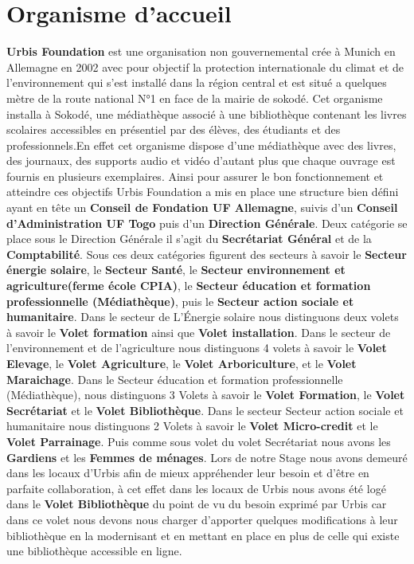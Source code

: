 \documentclass[12pt,a4paper]{article}
\begin{document}
\section{Organisme d'accueil}
\textbf{Urbis Foundation} est une organisation non gouvernemental crée à Munich en Allemagne en 2002 avec pour objectif la protection internationale du climat et de l’environnement qui s'est installé dans la région central et est situé a quelques mètre de la route national N°1 en face de la mairie de sokodé. Cet organisme installa à Sokodé, une médiathèque associé à une bibliothèque contenant les livres scolaires accessibles en présentiel par des élèves, des étudiants et des professionnels.En effet cet organisme dispose d'une médiathèque avec des livres, des journaux, des supports audio et vidéo d'autant plus que chaque ouvrage est fournis en plusieurs exemplaires. Ainsi pour assurer le bon fonctionnement et atteindre ces objectifs Urbis Foundation a mis en place une structure bien défini ayant en tête un \textbf{Conseil de Fondation UF Allemagne}, suivis d'un \textbf{Conseil d’Administration UF Togo} puis d'un \textbf{Direction Générale}. Deux catégorie se place sous le Direction Générale il s'agit du \textbf{Secrétariat Général} et de la \textbf{Comptabilité}. Sous ces deux catégories figurent des secteurs à savoir le \textbf{Secteur énergie solaire}, le \textbf{Secteur Santé}, le \textbf{Secteur environnement et agriculture(ferme école CPIA)}, le \textbf{Secteur éducation et formation professionnelle (Médiathèque)}, puis le \textbf{Secteur action sociale et humanitaire}. Dans le secteur de L’Énergie solaire nous distinguons deux volets à savoir le \textbf{Volet formation} ainsi que \textbf{Volet installation}. Dans le secteur de l'environnement et de l'agriculture nous distinguons 4 volets à savoir le \textbf{Volet Elevage}, le \textbf{Volet Agriculture}, le \textbf{Volet Arboriculture}, et le \textbf{Volet Maraichage}. Dans le Secteur éducation et formation professionnelle (Médiathèque), nous distinguons 3 Volets à savoir le \textbf{Volet Formation}, le \textbf{Volet Secrétariat} et le \textbf{Volet Bibliothèque}. Dans le secteur Secteur action sociale et humanitaire nous distinguons 2 Volets à savoir le \textbf{Volet Micro-credit} et le \textbf{Volet Parrainage}. Puis comme sous volet du volet Secrétariat nous avons les \textbf{Gardiens} et les \textbf{Femmes de ménages}. Lors de notre Stage nous avons demeuré dans les locaux d'Urbis afin de mieux appréhender leur besoin et d'être en parfaite collaboration, à cet effet dans les locaux de Urbis nous avons été logé dans le \textbf{Volet Bibliothèque} du point de vu du besoin exprimé par Urbis car dans ce volet nous devons nous charger d'apporter quelques modifications à leur bibliothèque en la modernisant et en mettant en place en plus de celle qui existe une bibliothèque accessible en ligne.\\
\end{document}
